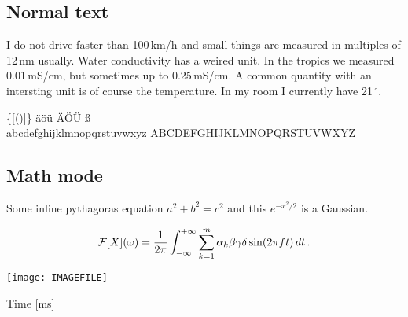 \subsection{Normal text}

I do not drive faster than 100\,km/h and small things are measured in
multiples of 12\,nm usually. Water conductivity has a weired unit. In
the tropics we measured 0.01\,mS/cm, but sometimes up to
0.25\,mS/cm. A common quantity with an intersting unit is of course
the temperature. In my room I currently have 21\,$^{\circ}$.

\bigskip
{} \qquad \{[()]\} \qquad \"a\"o\"u  \"A\"O\"U {\ss} \\
abcdefghijklmnopqrstuvwxyz \qquad ABCDEFGHIJKLMNOPQRSTUVWXYZ

\subsection{Math mode}

Some inline pythagoras equation $a^2 + b^2 = c^2$ and this $e^{-x^2/2}$ is a Gaussian.

\[ {\cal F}[X](\omega) = \frac{1}{2\pi}\int_{-\infty}^{+\infty} \sum_{k=1}^m \alpha_k\beta\gamma\delta\sin(2\pi f t)\,dt\,. \]

\noindent
\texttt{[image: IMAGEFILE]}
\centerline{Time [ms]}
